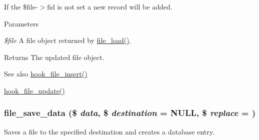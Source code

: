 If the \$file-\/$>$fid is not set a new record will be added.


\begin{DoxyParams}{Parameters}
\item[{\em \$file}]A file object returned by \hyperlink{group__file_ga138bd2e393c743b41a642003eecbf98f}{file\_\-load()}.\end{DoxyParams}
\begin{DoxyReturn}{Returns}
The updated file object.
\end{DoxyReturn}
\begin{DoxySeeAlso}{See also}
\hyperlink{group__hooks_gac40fa27583fc4cba927f486098eaa79b}{hook\_\-file\_\-insert()} 

\hyperlink{group__hooks_ga604abda1f5df3f041f7ef748b9762475}{hook\_\-file\_\-update()} 
\end{DoxySeeAlso}
\hypertarget{group__file_ga7a01611c7c08b91876d93431207dd9b0}{
\subsubsection[{file\_\-save\_\-data}]{\setlength{\rightskip}{0pt plus 5cm}file\_\-save\_\-data (\$ {\em data}, \/  \$ {\em destination} = {\ttfamily NULL}, \/  \$ {\em replace} = {})}}
\label{group__file_ga7a01611c7c08b91876d93431207dd9b0}
Saves a file to the specified destination and creates a database entry.



